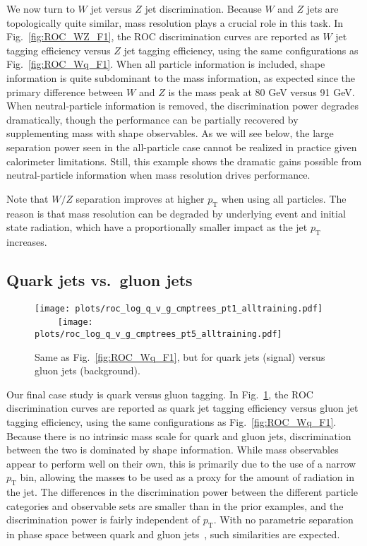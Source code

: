 \documentclass[11pt,letterpaper]{article}
\DeclareRobustCommand{\Fig}[1]{Fig.~\ref{#1}}
\newcommand{\pt}{p_{\mathrm{T}}}
\begin{document}
We now turn to $W$ jet versus $Z$ jet discrimination.
%
Because $W$ and $Z$ jets are topologically quite similar, mass resolution plays a crucial role in this task. 
%
In \Fig{fig:ROC_WZ_F1}, the ROC discrimination curves are reported as $W$ jet tagging efficiency versus $Z$ jet tagging efficiency, using the same configurations as \Fig{fig:ROC_Wq_F1}.
%
When all particle information is included, shape information is quite subdominant to the mass information, as expected since the primary difference between $W$ and $Z$ is the mass peak at 80 GeV versus 91 GeV.
%
When neutral-particle information is removed, the discrimination power degrades dramatically, though the performance can be partially recovered by supplementing mass with shape observables.
%
As we will see below, the large separation power seen in the all-particle case cannot be realized in practice given calorimeter limitations.
%
Still, this example shows the dramatic gains possible from neutral-particle information when mass resolution drives performance.

Note that $W/Z$ separation improves at higher $\pt$ when using all particles.  The reason is that mass resolution can be degraded by underlying event and initial state radiation, which have a proportionally smaller impact as the jet $\pt$ increases.


\subsection{Quark jets vs.\ gluon jets}

\begin{figure}[t]
\begin{center}
\texttt{[image: plots/roc\_log\_q\_v\_g\_cmptrees\_pt1\_alltraining.pdf]}
$\qquad$
\texttt{[image: plots/roc\_log\_q\_v\_g\_cmptrees\_pt5\_alltraining.pdf]}
\end{center}
\caption{Same as \Fig{fig:ROC_Wq_F1}, but for quark jets (signal) versus gluon jets (background).}
\label{fig:ROC_qg_F1}
\end{figure}

Our final case study is quark versus gluon tagging.
%
In \Fig{fig:ROC_qg_F1}, the ROC discrimination curves are reported as quark jet tagging efficiency versus gluon jet tagging efficiency, using the same configurations as \Fig{fig:ROC_Wq_F1}.
%
Because there is no intrinsic mass scale for quark and gluon jets, discrimination between the two is dominated by shape information.
%
While mass observables appear to perform well on their own, this is primarily due to the use of a narrow $\pt$ bin, allowing the masses to be used as a proxy for the amount of radiation in the jet.
%
The differences in the discrimination power between the different particle categories and observable sets are smaller than in the prior examples, and the discrimination power is fairly independent of $\pt$.
%
With no parametric separation in phase space between quark and gluon jets~\cite{Larkoski:2014gra}, such similarities are expected. 
\end{document}
